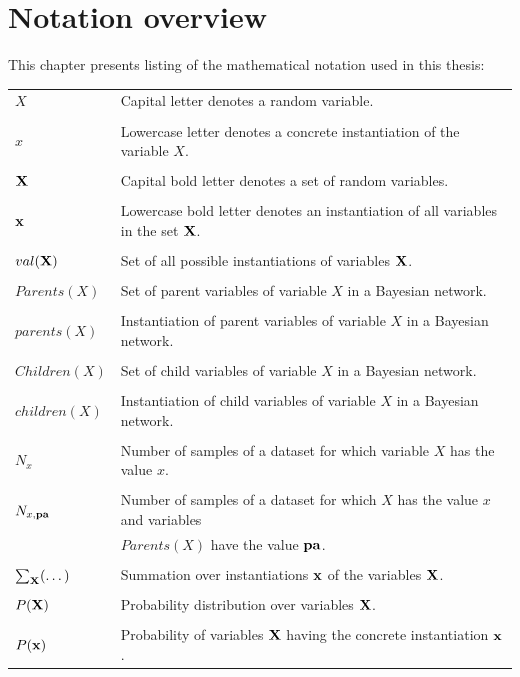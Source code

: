 \chapter{Notation overview}
This chapter presents listing of the mathematical notation used in this thesis:

\bigskip
\begin{tabular}{ll}
	$X$ & Capital letter denotes a random variable.\\
	&\\
	$x$ & Lowercase letter denotes a concrete instantiation of the variable $X$.\\
	&\\
	${\bold{X}}$ & Capital bold letter denotes a set of random variables.\\
	&\\
	${\bold{x}}$ & Lowercase bold letter denotes an instantiation of all variables in the set ${\bold{X}}$.\\
	&\\
	$val({\bold{X}})$ & Set of all possible instantiations of variables ${\bold{X}}$.\\
	&\\
	$Parents(X)$ & Set of parent variables of variable $X$ in a Bayesian network.\\
	&\\
	$parents(X)$ & Instantiation of parent variables of variable $X$ in a Bayesian network.\\
	&\\
	$Children(X)$ & Set of child variables of variable $X$ in a Bayesian network.\\
	&\\
	$children(X)$ & Instantiation of child variables of variable $X$ in a Bayesian network.\\
	&\\
	$N_x$ & Number of samples of a dataset for which variable $X$ has the value $x$.\\
	&\\
	$N_{x,{\bold{pa}}}$ & Number of samples of a dataset for which $X$ has the value $x$ and variables\\
	                  & $Parents(X)$ have the value ${\bold{pa}}$.\\
	&\\
	$\sum_{\bold{X}} (\dots)$ & Summation over instantiations ${\bold{x}}$ of the variables ${\bold{X}}$.\\
	&\\
	$P({\bold{X}})$ & Probability distribution over variables ${\bold{X}}$.\\
	&\\
	$P({\bold{x}})$ & Probability of variables ${\bold{X}}$ having the concrete instantiation ${\bold{x}}$.\\
\end{tabular}





